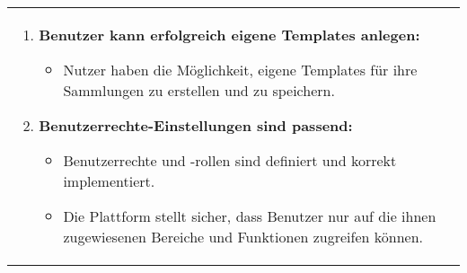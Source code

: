 \begin{tabularx}{\textwidth}{L R}
\begin{enumerate}[left=0pt,label=\arabic*.]
            \item \textbf{Benutzer kann erfolgreich eigene Templates anlegen:}
            \begin{itemize}[label=--]
                \item Nutzer haben die Möglichkeit, eigene Templates für ihre Sammlungen zu erstellen und zu speichern.
            \end{itemize}
            \item \textbf{Benutzerrechte-Einstellungen sind passend:}
            \begin{itemize}[label=--]
                \item Benutzerrechte und -rollen sind definiert und korrekt implementiert.
                \item Die Plattform stellt sicher, dass Benutzer nur auf die ihnen zugewiesenen Bereiche und Funktionen zugreifen können.
            \end{itemize}
        \end{enumerate}
    \end{tabularx}



